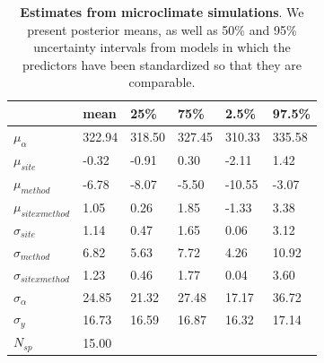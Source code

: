 \documentclass{article}\usepackage[]{graphicx}\usepackage[]{color}
\begin{document}
\begin{table}[ht]
\centering
\caption{\textbf{Estimates from microclimate simulations}. We present posterior means, as well as 50\% and 95\% uncertainty intervals from models in which the predictors have been standardized so that they are comparable.} 
\label{tab:micros}
\begingroup\footnotesize
\begin{tabular}{|p{}|p{}p{}p{}p{}p{}|}
  \hline
 & mean & 25\% & 75\% & 2.5\% & 97.5\% \\ 
  \hline
$\mu_{\alpha}$ & 322.94 & 318.50 & 327.45 & 310.33 & 335.58 \\ 
  $\mu_{site}$ & -0.32 & -0.91 & 0.30 & -2.11 & 1.42 \\ 
  $\mu_{method}$ & -6.78 & -8.07 & -5.50 & -10.55 & -3.07 \\ 
  $\mu_{sitexmethod}$ & 1.05 & 0.26 & 1.85 & -1.33 & 3.38 \\ 
  $\sigma_{site}$ & 1.14 & 0.47 & 1.65 & 0.06 & 3.12 \\ 
  $\sigma_{method}$ & 6.82 & 5.63 & 7.72 & 4.26 & 10.92 \\ 
  $\sigma_{sitexmethod}$ & 1.23 & 0.46 & 1.77 & 0.04 & 3.60 \\ 
  $\sigma_{\alpha}$ & 24.85 & 21.32 & 27.48 & 17.17 & 36.72 \\ 
  $\sigma_{y}$ & 16.73 & 16.59 & 16.87 & 16.32 & 17.14 \\ 
   \hline
$N_{sp}$ & 15.00 &  &  &  &  \\ 
   \hline
\end{tabular}
\endgroup
\end{table}
\end{document}
